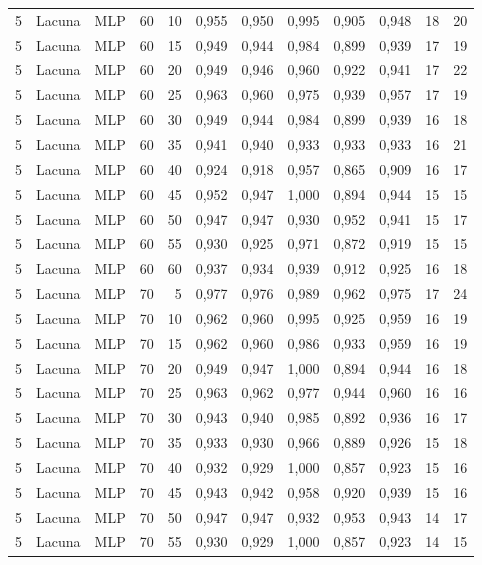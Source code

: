 \begin{longtable}{ccclrrrrrrrr}
5 & Lacuna & MLP & 60 & 10 & 0,955 & 0,950 & 0,995 & 0,905 & 0,948 & 18 & 20 \\
5 & Lacuna & MLP & 60 & 15 & 0,949 & 0,944 & 0,984 & 0,899 & 0,939 & 17 & 19 \\
5 & Lacuna & MLP & 60 & 20 & 0,949 & 0,946 & 0,960 & 0,922 & 0,941 & 17 & 22 \\
5 & Lacuna & MLP & 60 & 25 & 0,963 & 0,960 & 0,975 & 0,939 & 0,957 & 17 & 19 \\
5 & Lacuna & MLP & 60 & 30 & 0,949 & 0,944 & 0,984 & 0,899 & 0,939 & 16 & 18 \\
5 & Lacuna & MLP & 60 & 35 & 0,941 & 0,940 & 0,933 & 0,933 & 0,933 & 16 & 21 \\
5 & Lacuna & MLP & 60 & 40 & 0,924 & 0,918 & 0,957 & 0,865 & 0,909 & 16 & 17 \\
5 & Lacuna & MLP & 60 & 45 & 0,952 & 0,947 & 1,000 & 0,894 & 0,944 & 15 & 15 \\
5 & Lacuna & MLP & 60 & 50 & 0,947 & 0,947 & 0,930 & 0,952 & 0,941 & 15 & 17 \\
5 & Lacuna & MLP & 60 & 55 & 0,930 & 0,925 & 0,971 & 0,872 & 0,919 & 15 & 15 \\
5 & Lacuna & MLP & 60 & 60 & 0,937 & 0,934 & 0,939 & 0,912 & 0,925 & 16 & 18 \\
5 & Lacuna & MLP & 70 & 5 & 0,977 & 0,976 & 0,989 & 0,962 & 0,975 & 17 & 24 \\
5 & Lacuna & MLP & 70 & 10 & 0,962 & 0,960 & 0,995 & 0,925 & 0,959 & 16 & 19 \\
5 & Lacuna & MLP & 70 & 15 & 0,962 & 0,960 & 0,986 & 0,933 & 0,959 & 16 & 19 \\
5 & Lacuna & MLP & 70 & 20 & 0,949 & 0,947 & 1,000 & 0,894 & 0,944 & 16 & 18 \\
5 & Lacuna & MLP & 70 & 25 & 0,963 & 0,962 & 0,977 & 0,944 & 0,960 & 16 & 16 \\
5 & Lacuna & MLP & 70 & 30 & 0,943 & 0,940 & 0,985 & 0,892 & 0,936 & 16 & 17 \\
5 & Lacuna & MLP & 70 & 35 & 0,933 & 0,930 & 0,966 & 0,889 & 0,926 & 15 & 18 \\
5 & Lacuna & MLP & 70 & 40 & 0,932 & 0,929 & 1,000 & 0,857 & 0,923 & 15 & 16 \\
5 & Lacuna & MLP & 70 & 45 & 0,943 & 0,942 & 0,958 & 0,920 & 0,939 & 15 & 16 \\
5 & Lacuna & MLP & 70 & 50 & 0,947 & 0,947 & 0,932 & 0,953 & 0,943 & 14 & 17 \\
5 & Lacuna & MLP & 70 & 55 & 0,930 & 0,929 & 1,000 & 0,857 & 0,923 & 14 & 15 \\

\end{longtable}
